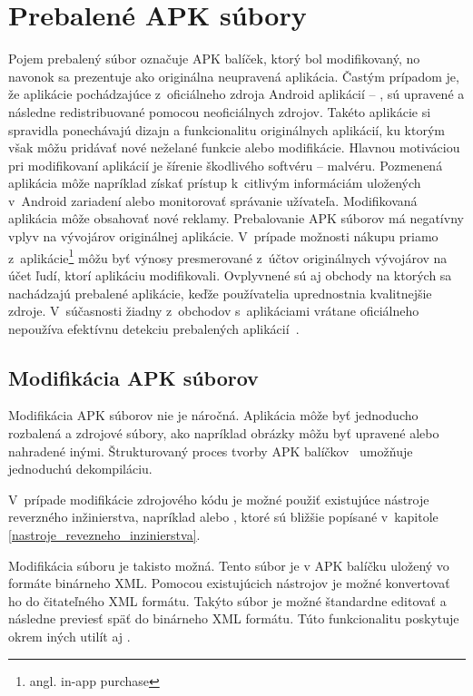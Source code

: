 \chapter{Prebalené APK súbory}
\label{Repackaged}
Pojem prebalený súbor označuje APK balíček, ktorý bol modifikovaný, no navonok sa prezentuje ako originálna neupravená aplikácia. Častým prípadom je, že aplikácie pochádzajúce z~oficiálneho zdroja Android aplikácií -- , sú upravené a následne redistribuované pomocou neoficiálnych zdrojov. Takéto aplikácie si spravidla ponechávajú dizajn a funkcionalitu originálnych aplikácií, ku ktorým však môžu pridávať nové neželané funkcie alebo modifikácie. Hlavnou motiváciou pri modifikovaní aplikácií je šírenie škodlivého softvéru – malvéru. Pozmenená aplikácia môže napríklad získať prístup k~citlivým informáciám uložených v~Android zariadení alebo monitorovať správanie užívateľa. Modifikovaná aplikácia môže obsahovať nové reklamy. Prebalovanie APK súborov má negatívny vplyv na vývojárov originálnej aplikácie. V~prípade možnosti nákupu priamo z~aplikácie\footnote{angl. in-app purchase} môžu byť výnosy presmerované z~účtov originálnych vývojárov na účet ľudí, ktorí aplikáciu modifikovali. Ovplyvnené sú aj obchody na ktorých sa nachádzajú prebalené aplikácie, keďže používatelia uprednostnia kvalitnejšie zdroje. V~súčasnosti žiadny z~obchodov s~aplikáciami vrátane oficiálneho  nepoužíva efektívnu detekciu prebalených aplikácií~\cite{Zhauniarovich2014}. 

\section{Modifikácia APK súborov}
Modifikácia APK súborov nie je náročná. Aplikácia môže byť jednoducho rozbalená a zdrojové súbory, ako napríklad obrázky môžu byť upravené alebo nahradené inými. Štrukturovaný proces tvorby APK balíčkov~\cite{buildingAndRunning} umožňuje jednoduchú dekompiláciu. 

V~prípade modifikácie zdrojového kódu je možné použiť existujúce nástroje reverzného inžinierstva, napríklad  alebo , ktoré sú bližšie popísané v~kapitole \ref{nastroje_revezneho_inzinierstva}. 

Modifikácia súboru  je takisto možná. Tento súbor je v APK balíčku uložený vo formáte binárneho XML. Pomocou existujúcich nástrojov je možné konvertovať ho do čitateľného XML formátu. Takýto súbor je možné štandardne editovať a následne previesť späť do binárneho XML formátu. Túto funkcionalitu poskytuje okrem iných utilít aj .

